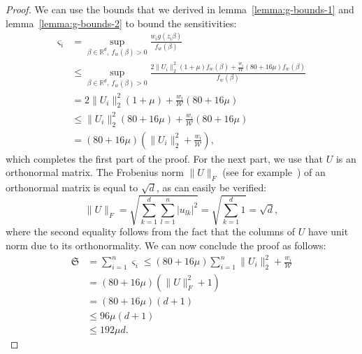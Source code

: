 \begin{proof}
    We can use the bounds that we derived in lemma~\ref{lemma:g-bounds-1}
    and lemma~\ref{lemma:g-bounds-2} to bound the sensitivities:
    \begin{align*}
        \varsigma_i
         & = \sup_{\beta \in \mathbb{R}^d,\ f_w(\beta)>0} \frac{w_i g(z_i \beta)}{f_w(\beta)}                   \\
         & \leq \sup_{\beta \in \mathbb{R}^d,\ f_w(\beta)>0} \frac{2 \lVert U_i \rVert_2^2 (1 + \mu) f_w(\beta)
            + \frac{w_i}{\mathcal{W}} (80 + 16 \mu) f_w(\beta)}{f_w(\beta)}                                     \\
         & = 2 \lVert U_i \rVert_2^2 (1 + \mu) + \frac{w_i}{\mathcal{W}} (80 + 16 \mu)                          \\
         & \leq \lVert U_i \rVert_2^2 (80 + 16 \mu) +  \frac{w_i}{\mathcal{W}} (80 + 16 \mu)                    \\
         & = (80 + 16\mu)(\lVert U_i \rVert_2^2 + \frac{w_i}{\mathcal{W}}),
    \end{align*}
    which completes the first part of the proof.
    For the next part, we use that $U$ is an orthonormal matrix.
    The Frobenius norm $\lVert U \rVert_F$
    (see for example~\cite{matrix-computations}) of an orthonormal matrix
    is equal to $\sqrt{d}$, as can easily be verified:
    \begin{equation*}
        \lVert U \rVert_F = \sqrt{\sum_{k=1}^d \sum_{l=1}^n \lvert u_{lk} \rvert^2}
        = \sqrt{\sum_{k=1}^d 1} = \sqrt{d},
    \end{equation*}
    where the second equality follows from the fact that the columns of
    $U$ have unit norm due to its orthonormality. We can now conclude the
    proof as follows:
    \begin{align*}
        \mathfrak{S}
         & = \sum_{i=1}^n \varsigma_i \leq (80 + 16\mu) \sum_{i=1}^n \lVert U_i \rVert_2^2 + \frac{w_i}{\mathcal{W}} \\
         & = (80 + 16 \mu)(\lVert U \rVert_F^2 + 1)                                                                  \\
         & = (80 + 16 \mu)(d + 1)                                                                                    \\
         & \leq 96 \mu(d + 1)                                                                                        \\
         & \leq 192 \mu d.
    \end{align*}
\end{proof}

